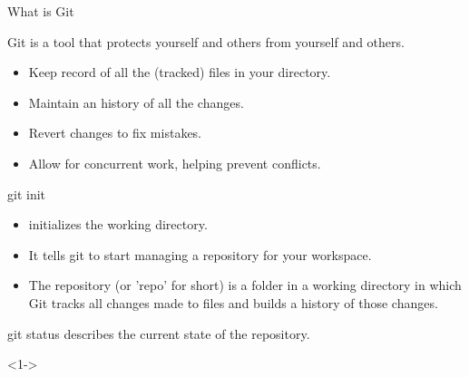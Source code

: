 \begin{frame}[fragile]{What is Git}
			
	Git is a tool that protects yourself and others from yourself and others.
		
	\begin{itemize}
		\item <2-> Keep record of all the (tracked) files in your directory.
		\item <3-> Maintain an history of all the changes.
		\item <4-> Revert changes to fix mistakes.
		\item <5-> Allow for concurrent work, helping prevent conflicts.
	\end{itemize}
		
			
\end{frame}

\begin{frame}[fragile]{git init}
	\begin{itemize}[<+->]
		\item  {} initializes the working directory.
		      		      
		\item It tells git to start managing a \alert{repository} for your workspace.
		      		       
		\item The repository (or 'repo' for short) is a folder in a working directory in which Git tracks all changes made to files and builds a history of those changes.
		      		       
	\end{itemize}
\end{frame}

\begin{frame}[fragile]{git status}
     describes the current state of the repository.

	\begin{shellblock}<1->{
}\end{shellblock}
		      		       
\end{frame}

